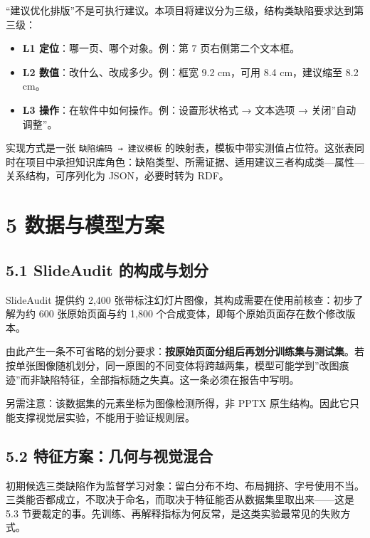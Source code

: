 \documentclass[
  11pt,
]{article}
\providecommand{\tightlist}{%
  \setlength{\itemsep}{0pt}\setlength{\parskip}{0pt}}
\begin{document}
``建议优化排版''不是可执行建议。本项目将建议分为三级，结构类缺陷要求达到第三级：

\begin{itemize}
\tightlist
\item
  \textbf{L1 定位}：哪一页、哪个对象。例：第 7 页右侧第二个文本框。
\item
  \textbf{L2 数值}：改什么、改成多少。例：框宽 9.2 cm，可用 8.4
  cm，建议缩至 8.2 cm。
\item
  \textbf{L3 操作}：在软件中如何操作。例：设置形状格式 → 文本选项 →
  关闭''自动调整''。
\end{itemize}

实现方式是一张 \texttt{缺陷编码\ →\ 建议模板}
的映射表，模板中带实测值占位符。这张表同时在项目中承担知识库角色：缺陷类型、所需证据、适用建议三者构成类---属性---关系结构，可序列化为
JSON，必要时转为 RDF。

\section{5
数据与模型方案}\label{ux6570ux636eux4e0eux6a21ux578bux65b9ux6848}

\subsection{5.1 SlideAudit
的构成与划分}\label{slideaudit-ux7684ux6784ux6210ux4e0eux5212ux5206}

SlideAudit 提供约 2,400
张带标注幻灯片图像，其构成需要在使用前核查：初步了解为约 600
张原始页面与约 1,800 个合成变体，即每个原始页面存在数个修改版本。

由此产生一条不可省略的划分要求：\textbf{按原始页面分组后再划分训练集与测试集}。若按单张图像随机划分，同一原图的不同变体将跨越两集，模型可能学到''改图痕迹''而非缺陷特征，全部指标随之失真。这一条必须在报告中写明。

另需注意：该数据集的元素坐标为图像检测所得，非 PPTX
原生结构。因此它只能支撑视觉层实验，不能用于验证规则层。

\subsection{5.2
特征方案：几何与视觉混合}\label{ux7279ux5f81ux65b9ux6848ux51e0ux4f55ux4e0eux89c6ux89c9ux6df7ux5408}

初期候选三类缺陷作为监督学习对象：留白分布不均、布局拥挤、字号使用不当。三类能否都成立，不取决于命名，而取决于特征能否从数据集里取出来------这是
5.3
节要裁定的事。先训练、再解释指标为何反常，是这类实验最常见的失败方式。
\end{document}
